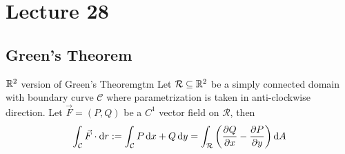 \documentclass[../Analysis-3.tex]{subfiles}
\begin{document}
\chapter*{Lecture 28} %
\setcounter{chapter}{28} %
\setcounter{section}{0}

\newcommand{\inti}[3]{\int_{#1} {#2} \hspace{0.1cm} \dd {#3}}

\section{Green's Theorem}
\begin{Thm}{$\mathbb{R}^2$ version of Green's Theorem}{gtm}
  Let $\mathcal{R} \subseteq \mathbb{R}^2 $ be a simply connected domain with boundary curve $\mathcal{C}$ where parametrization is taken in anti-clockwise direction. Let $\vec{F} = (P,Q)$ be a $C^1$ vector field on $\mathcal{R}$, then
  \[
    \int_{\mathcal{C}} \vec{F} \cdot \dd r := \int_{\mathcal{C}} P \, \dd x + Q \, \dd y = \int_{\mathcal{R}} \left( \pdv{Q}{x} - \pdv{P}{y}\right) \dd A
  \]
\end{Thm}
\end{document}
